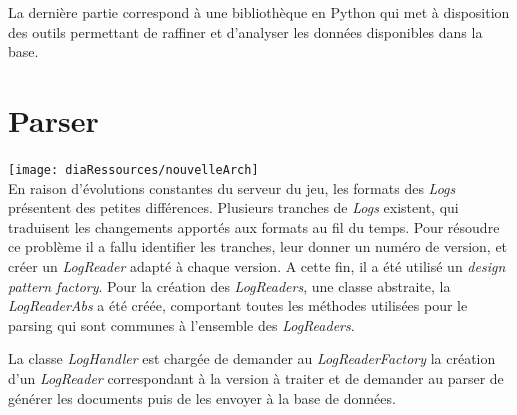 
La dernière partie correspond à une bibliothèque en Python qui met à disposition des outils permettant de raffiner et d'analyser les données disponibles dans la base. 


\section{Parser}

\texttt{[image: diaRessources/nouvelleArch]}\\
En raison d'évolutions constantes du serveur du jeu, les formats des \textit{Logs} présentent des petites différences. Plusieurs tranches de \textit{Logs} existent, qui traduisent les changements apportés aux formats au fil du temps. 
Pour résoudre ce problème il a fallu identifier les tranches, leur donner un numéro de version, et créer un \textit{LogReader} adapté à chaque version. A cette fin, il a été utilisé un \textit{design pattern factory}.
Pour la création des \textit{LogReaders}, une classe abstraite, la \textit{LogReaderAbs} a été créée, comportant toutes les méthodes utilisées pour le parsing qui sont communes à l'ensemble des \textit{LogReaders}. 

La classe \textit{LogHandler} est chargée de demander au \textit{LogReaderFactory} la création d'un \textit{LogReader} correspondant à la version à traiter et de demander au parser de générer les documents puis de les envoyer à la base de données. 
 
